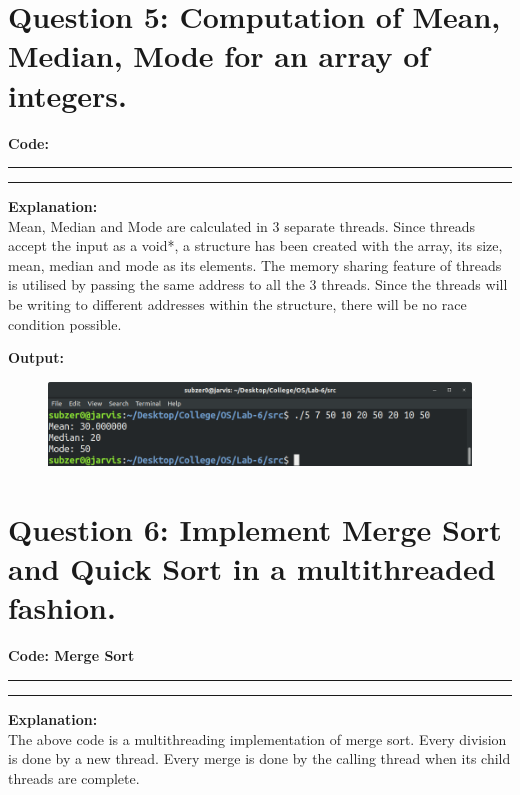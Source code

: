 \documentclass{article}
\begin{document}
\section*{Question 5: Computation of Mean, Median, Mode for an array of integers.}
\bigskip

\par\noindent
\textbf{\Large Code: }
\smallskip
\par\noindent\rule{\textwidth}{0.4pt}

\par\noindent\rule{\textwidth}{0.4pt}

\bigskip
\noindent
\textbf{\Large Explanation: } \\

Mean, Median and Mode are calculated in 3 separate threads. Since
threads accept the input as a void*, a structure has been created
with the array, its size, mean, median and mode as its elements.
The memory sharing feature of threads is utilised by passing the
same address to all the 3 threads. Since the threads will be 
writing to different addresses within the structure, there will be no race condition
possible.

\bigskip
\noindent
\textbf{\Large Output:}

\begin{figure}[h]
	\includegraphics[width=\textwidth]{output/5.png}
\end{figure}
\bigskip

\section*{Question 6: Implement Merge Sort and Quick Sort in a multithreaded fashion.}
\bigskip

\par\noindent
\textbf{\Large Code: Merge Sort}
\smallskip
\par\noindent\rule{\textwidth}{0.4pt}

\par\noindent\rule{\textwidth}{0.4pt}

\bigskip
\noindent
\textbf{\Large Explanation: } \\

The above code is a multithreading implementation of merge sort. 
Every division is done by a new thread. Every merge is done by 
the calling thread when its child threads are complete. 
\end{document}
